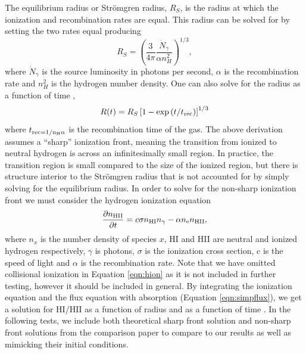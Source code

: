 \documentclass[fleq,usenatbib]{mnras}
\newcommand{\strom}{Str\"omgren}
\begin{document}
The equilibrium radius or \strom{} radius, $R_S$, is the radius at which the 
ionization and recombination rates are equal. This radius can be solved for by 
setting the two rates equal producing \citep[e.g.][]{tielens05}
\begin{equation}
R_S = \left(\frac{3}{4\pi}\frac{\dot{N}_\gamma}{\alpha n^2_{H}}\right)^{1/3},
\end{equation}
where $\dot{N}_\gamma$ is the source luminosity in photons per second, 
$\alpha$ is the recombination rate and $n^2_H$ is the hydrogen number density. 
One can also solve for the radius as a function of time 
\citep[e.g.][]{spitzer78},
\begin{equation}
R(t) = R_S\left[1-\exp\left(t/t_{\rm rec}\right)\right]^{1/3}
\end{equation}
where $t_{\rm rec = 1/{n_H \alpha}}$ is the recombination time of the 
gas. The above derivation assumes a ``sharp'' ionization front, meaning the 
transition from ionized to neutral hydrogen is across an infinitesimally small 
region. In practice, the transition region is small compared to the size of 
the ionized region, but there is structure interior to the \strom{} radius 
that is not accounted for by simply solving for the equilibrium radius. In 
order to solve for the non-sharp ionization front we must consider the 
hydrogen ionization equation
\begin{equation}\label{eqn:hion}
\frac{\partial n_{\rm HII}}{\partial t} = c \sigma n_{\rm HI} n_{\gamma} - 
\alpha n_{\rm e} n_{\rm HII},
\end{equation}
where $n_x$ is the number density of species $x$, HI and HII are neutral 
and ionized hydrogen respectively, $\gamma$ is photons, $\sigma$ is the 
ionization cross section, c is the speed of light and $\alpha$ is the 
recombination rate. Note that we have omitted collisional ionization in 
Equation \ref{eqn:hion} as it is not included in further testing, however it 
should be included in general. By integrating the ionization equation and the 
flux equation with absorption (Equation \ref{eqn:simpflux}), we get a solution 
for HI/HII as a function of radius and as a function of time 
\citep{osterbrockFerland2006}. In the following tests, we include both 
theoretical sharp front solution and non-sharp front solutions from the 
\cite{ilievEt06} comparison paper to compare to our results as well as 
mimicking their initial conditions.
\end{document}
